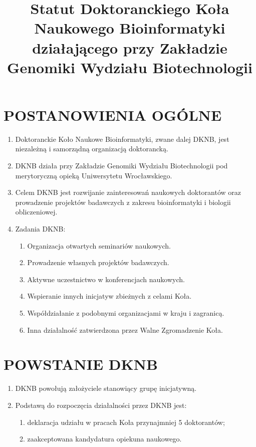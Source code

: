 \documentclass{article}
\title{Statut Doktoranckiego Koła Naukowego Bioinformatyki działającego przy Zakładzie Genomiki Wydziału Biotechnologii}
\date{}
\begin{document}
\maketitle

\section{POSTANOWIENIA OGÓLNE}
  \begin{enumerate}
    \item Doktoranckie Koło Naukowe Bioinformatyki, zwane dalej DKNB, jest niezależną i samorządną organizacją doktorancką.
    \item DKNB działa przy Zakładzie Genomiki Wydziału Biotechnologii pod merytoryczną opieką Uniwersytetu Wrocławskiego.
    \item Celem DKNB jest rozwijanie zainteresowań naukowych doktorantów oraz prowadzenie projektów badawczych z zakresu bioinformatyki i biologii obliczeniowej.
    \item Zadania DKNB:
	\begin{enumerate}
	 \item Organizacja otwartych seminariów naukowych.
       \item Prowadzenie własnych projektów badawczych.
	 \item Aktywne uczestnictwo w konferencjach naukowych.
	 \item Wspieranie innych inicjatyw zbieżnych z celami Koła.
	 \item Współdziałanie z podobnymi organizacjami w kraju i zagranicą.
	 \item Inna działalność zatwierdzona przez Walne Zgromadzenie Koła.
	\end{enumerate}
  \end{enumerate}

\section{POWSTANIE DKNB}
  \begin{enumerate}
    \item DKNB powołują założyciele stanowiący grupę inicjatywną.
    \item Podstawą do rozpoczęcia działalności przez DKNB jest:
      \begin{enumerate}
        \item deklaracja udziału w pracach Koła przynajmniej 5 doktorantów;
        \item zaakceptowana kandydatura opiekuna naukowego.
      \end{enumerate}
  \end{enumerate}
\end{document}
